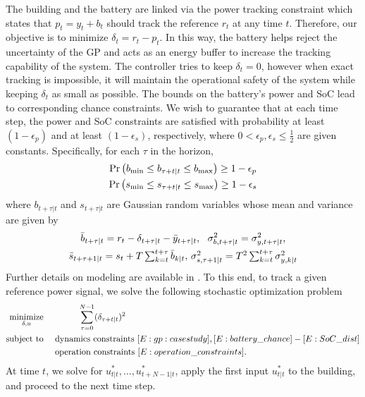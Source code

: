 The building and the battery are linked via the power tracking constraint which states that \(p_t = y_t + b_t\) should track the reference \(r_t\) at any time \(t\). Therefore, our objective is to minimize \(\delta_t = r_t - p_t\).
In this way, the battery helps reject the uncertainty of the GP and acts as an energy buffer to increase the tracking capability of the system. 
The controller tries to keep \(\delta_t = 0\), however when exact tracking is impossible, it will maintain the operational safety of the system while keeping \(\delta_t\)  as small as possible.
The bounds on the battery's power and SoC lead to corresponding chance constraints.
We wish to guarantee that at each time step, the power and SoC constraints are satisfied with probability at least \((1 - \epsilon_p)\) and  at least \((1 - \epsilon_s)\), respectively, where \(0 < \epsilon_p, \epsilon_s \leq \frac{1}{2}\) are given constants.
Specifically, for each \(\tau\) in the horizon,
	\begin{gather}
	\label{E:battery_chance}
	\Pr\left( \Pbmin \leq b_{\tau+t|t}\leq \Pbmax \right) \geq 1 - \epsilon_p  \\
	\label{E:SoC_chance}
	\Pr\left( \SOCmin \leq s_{\tau+t|t} \leq \SOCmax \right) \geq 1 - \epsilon_s 
	\end{gather}
where \(b_{t+\tau|t}\) and \(s_{t+\tau|t}\) are Gaussian random variables whose mean and variance are given by
\begin{gather}
\label{E:battery_dist}
\bar{b}_{t+\tau|t}= r_{t} - \delta_{t+\tau|t} - \bar{y}_{t+\tau|t}, \ \ 
\sigma^2_{b,t+\tau|t} =  \sigma^2_{y,t+\tau|t} \text, \\
\label{E:SoC_dist}
\bar{s}_{t+\tau+1|t}= s_t + T \textstyle\sum_{k=t}^{t+\tau} \predict{k}{\bar{\Pbatt}}, \,
\predict{s,\tau+1}{\sigma^2} = T^2 \textstyle\sum_{k=t}^{t+\tau} \predict{y,k}{\sigma^2}
\end{gather}
Further details on modeling are available in \cite{nghiemetal16gp}.
To this end, to track a given reference power signal, we solve the following stochastic optimization problem
\begin{align}
\label{E:casestudy:mpc}
\minimize_{\delta, u} & \ \ \ \ \ \ \ \ \ \ \ \ \sum_{\tau=0}^{N-1} (\delta_{\tau+t|t})^2\\
\st &  \ \ \ \  \text{dynamics constraints } \eqref{E:gp:casestudy}, \eqref{E:battery_chance} - \eqref{E:SoC_dist} \nonumber \\
&  \ \ \ \  \text{operation constraints } \eqref{E:operation_constraints}. \nonumber
\end{align}
At time \(t\), we solve for \(u^*_{t|t},\dots,u^*_{t+N-1|t} \), apply the first input \(u^*_{t|t} \) to the building, and proceed to the next time step.

